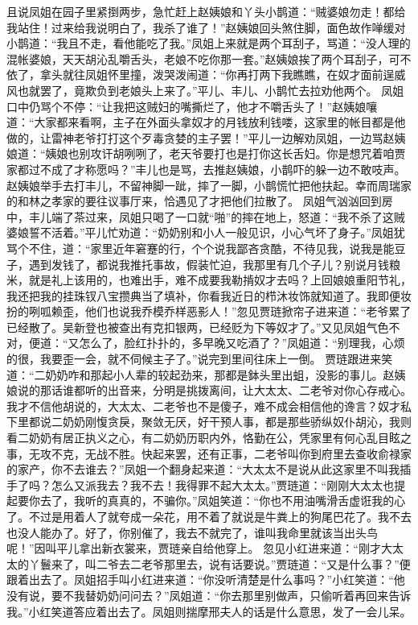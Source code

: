 \documentclass[12pt,oneside]{book}
\begin{document}
且说凤姐在园子里紧捯两步，急忙赶上赵姨娘和丫头小鹊道：“贼婆娘勿走！都给我站住！过来给我说明白了，我杀了谁了！”赵姨娘回头煞住脚，面色故作啴缓对小鹊道：“我且不走，看他能吃了我。”凤姐上来就是两个耳刮子，骂道：“没人理的混帐婆娘，天天胡沁乱嚼舌头，老娘不吃你那一套。”赵姨娘挨了两个耳刮子，可不依了，拿头就往凤姐怀里撞，泼哭泼闹道：“你再打两下我瞧瞧，在奴才面前逞威风也就罢了，竟欺负到老娘头上来了。”平儿、丰儿、小鹊忙去拉劝他两个。
凤姐口中仍骂个不停：“让我把这贼妇的嘴撕烂了，他才不嚼舌头了！”赵姨娘嚷道：“大家都来看啊，主子在外面头拿奴才的月钱放利钱喽，这家里的帐目都是他做的，让雷神老爷打打这个歹毒贪婪的主子罢！”平儿一边解劝凤姐，一边骂赵姨娘道：“姨娘也别攻讦胡咧咧了，老天爷要打也是打你这长舌妇。你是想咒着咱贾家都过不成了才称愿吗？”丰儿也是骂，去推赵姨娘，小鹊吓的躲一边不敢吱声。赵姨娘举手去打丰儿，不留神脚一跐，摔了一脚，小鹊慌忙把他扶起。幸而周瑞家的和林之孝家的要往议事厅来，恰遇见了才把他们拉散了。
凤姐气汹汹回到房中，丰儿端了茶过来，凤姐只喝了一口就“啪”的摔在地上，怒道：“我不杀了这贼婆娘誓不活着。”平儿忙劝道：“奶奶别和小人一般见识，小心气坏了身子。”凤姐犹骂个不住，道：“家里近年窘蹇的行，个个说我鄙吝贪酷，不待见我，说我是能豆子，遇到发钱了，都说我推托事故，假装忙迫，我那里有几个子儿？别说月钱粮米，就是礼上该用的，也难出手，难不成要我勒掯奴才去吗？上回娘娘重阳节礼，我还把我的挂珠钗八宝攒典当了填补，你看我近日的栉沐妆饰就知道了。我即便妆扮的咧呱赖歪，他们也说我乔模乔样恶影人！”忽见贾琏掀帘子进来道：“老爷累了已经散了。吴新登也被查出有克扣银两，已经贬为下等奴才了。”又见凤姐气色不对，便道：“又怎么了，脸红扑扑的，多早晚又吃酒了？”凤姐道：“别理我，心烦的很，我要歪一会，就不伺候主子了。”说完到里间往床上一倒。
贾琏跟进来笑道：“二奶奶咋和那起小人辈的较起劲来，那都是鉢头里出蛆，没影的事儿。赵姨娘说的那话谁都听的出音来，分明是挑拨离间，让大太太、二老爷对你心存戒心。我才不信他胡说的，大太太、二老爷也不是傻子，难不成会相信他的谗言？奴才私下里都说二奶奶刚愎贪戾，聚敛无厌，好干预人事，都是那些骄纵奴仆胡沁，我则看二奶奶有居正执义之心，有二奶奶历职内外，恪勤在公，凭家里有何心乱目眩之事，无攻不克，无战不胜。快起来罢，还有正事，二老爷叫你到府里去查收俞禄家的家产，你不去谁去？”凤姐一个翻身起来道：“大太太不是说从此这家里不叫我插手了吗？怎么又派我去？我不去！我得罪不起大太太。”贾琏道：“刚刚大太太也提起要你去了，我听的真真的，不骗你。”凤姐笑道：“你也不用油嘴滑舌虚诳我的心了。不过是用着人了就夸成一朵花，用不着了就说是牛粪上的狗尾巴花了。我不去也没人能办了。好了，你别催了，我去不就完了，谁叫我命里就该当出头鸟呢！”因叫平儿拿出新衣裳来，贾琏亲自给他穿上。
忽见小红进来道：“刚才大太太的丫鬟来了，叫二爷去二老爷那里去，说有话要说。”贾琏道：“又是什么事？”便跟着出去了。凤姐招手叫小红进来道：“你没听清楚是什么事吗？”小红笑道：“他没有说，要不我替奶奶问问去？”凤姐道：“你去那里别做声，只偷听着再回来告诉我。”小红笑道答应着出去了。凤姐则揣摩邢夫人的话是什么意思，发了一会儿呆。
\end{document}

